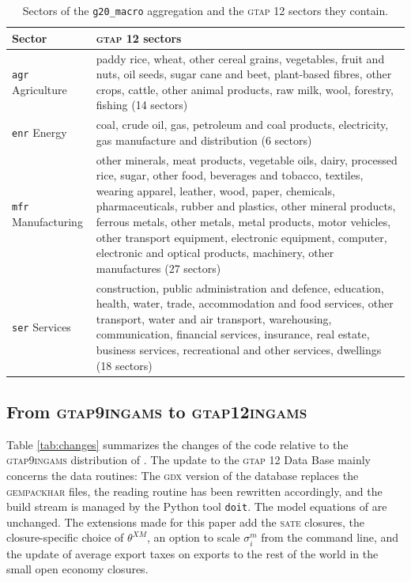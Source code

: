 \documentclass{jgea}
\newcommand{\GDX}{\textsc{gdx}\xspace}
\newcommand{\HAR}{\textsc{har}\xspace}
\newcommand{\SATE}{\textsc{sate}\xspace}
\newcommand{\GTAP}{\textsc{gtap}\xspace}
\newcommand{\GTAPtwelve}{\textsc{gtap12ingams}\xspace}
\newcommand{\GTAPnine}{\textsc{gtap9ingams}\xspace}
\newcommand{\GEMPACK}{\textsc{gempack}\xspace}
\begin{document}
\begin{table}[t!]
\begin{center}
\caption{Sectors of the \texttt{g20\_macro} aggregation and the \GTAP 12 sectors they contain.}\label{tab:sectors}
\small
\begin{tabular}{lp{10.5cm}}
\toprule
Sector & \GTAP 12 sectors \\
\midrule
\texttt{agr} Agriculture & paddy rice, wheat, other cereal grains,
vegetables, fruit and nuts, oil seeds, sugar cane and beet, plant-based
fibres, other crops, cattle, other animal products, raw milk, wool,
forestry, fishing (14 sectors)\\
\texttt{enr} Energy & coal, crude oil, gas, petroleum and coal
products, electricity, gas manufacture and distribution (6 sectors)\\
\texttt{mfr} Manufacturing & other minerals, meat products, vegetable
oils, dairy, processed rice, sugar, other food, beverages and tobacco,
textiles, wearing apparel, leather, wood, paper, chemicals,
pharmaceuticals, rubber and plastics, other mineral products, ferrous
metals, other metals, metal products, motor vehicles, other transport
equipment, electronic equipment, computer, electronic and optical
products, machinery, other manufactures (27 sectors)\\
\texttt{ser} Services & construction, public administration and
defence, education, health, water, trade, accommodation and food
services, other transport, water and air transport, warehousing,
communication, financial services, insurance, real estate, business
services, recreational and other services, dwellings (18 sectors)\\
\bottomrule
\end{tabular}
\end{center}
\end{table}

\subsection{From \GTAPnine to \GTAPtwelve}\label{sec:update}

Table \ref{tab:changes} summarizes the changes of the code relative to the \GTAPnine distribution of \citet{LanzRutherford2016}.
The update to the \GTAP 12 Data Base mainly concerns the data routines:
The \GDX version of the database replaces the \GEMPACK \HAR files, the reading routine has been rewritten accordingly, and the build stream is managed by the Python tool \texttt{doit}.
The model equations of \citet{LanzRutherford2016} are unchanged.
The extensions made for this paper add the \SATE closures, the closure-specific choice of $\theta^{XM}$, an option to scale $\sigma^m_i$ from the command line, and the update of average export taxes on exports to the rest of the world in the small open economy closures.
\end{document}
